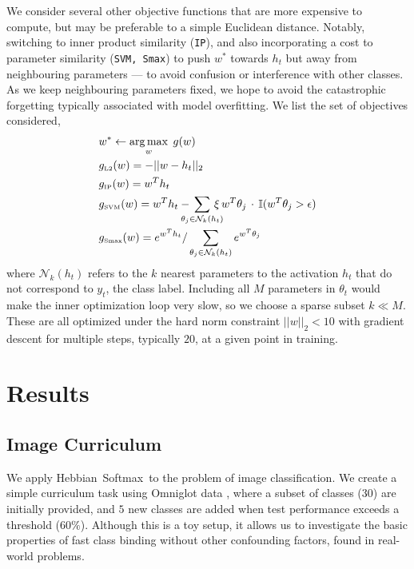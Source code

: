 \documentclass{article} \usepackage{hyperref}
\DeclareMathOperator*{\argmax}{arg\,max}
\newcommand{\model}{\hbox{Hebbian Softmax }}
\def\argmax{\operatornamewithlimits{arg\,max}}
\def\Ncal{\mathcal{N}}
\begin{document}
We consider several other objective functions that are more expensive to compute, but may be preferable to a simple Euclidean distance. Notably, switching to inner product similarity (\texttt{IP}), and also incorporating a cost to parameter similarity (\texttt{SVM, Smax}) to push $w^*$ towards $h_t$ but away from neighbouring parameters --- to avoid confusion or interference with other classes. As we keep neighbouring parameters fixed, we hope to avoid the catastrophic forgetting typically associated with model overfitting. We list the set of objectives considered,
\begin{align}
\label{eq:overfitting_procedures}
& w^* \leftarrow \argmax_w \; g(w) \notag \\
& g_{\tiny \hbox{L2}}(w) = -||w - h_t||_2 \\
& g_{\tiny \hbox{IP}}(w) = w^T h_t \\
& g_{\tiny \hbox{SVM}}(w) = w^T h_t - \kern-1em \displaystyle\sum_{\theta_j \in \Ncal_k(h_t)} \kern-1em \xi \, w^T \theta_j \, \cdot \, \mathbb{I}(w^T \theta_j > \epsilon) \\
& g_{\tiny \hbox{Smax}}(w)  = e^{w^T h_t} / \displaystyle\sum_{\theta_j \in \Ncal_k(h_t)} e^{w^T \theta_j}
\end{align}
where $\Ncal_k(h_t)$ refers to the $k$ nearest parameters to the activation $h_t$ that do not correspond to $y_t$, the class label. Including all $M$ parameters in $\theta_t$ would make the inner optimization loop very slow, so we choose a sparse subset $k \ll M$. These are all optimized under the hard norm constraint $||w||_2 < 10$ with gradient descent for multiple steps, typically $20$, at a given point in training. 

\section{Results}
\subsection{Image Curriculum}

We apply \model to the problem of image classification. We create a simple curriculum task using Omniglot data \cite{lake2015human}, where a subset of classes ($30$) are initially provided, and $5$ new classes are added when test performance exceeds a threshold ($60\%$). Although this is a toy setup, it allows us to investigate the basic properties of fast class binding without other confounding factors, found in real-world problems.
\end{document}
